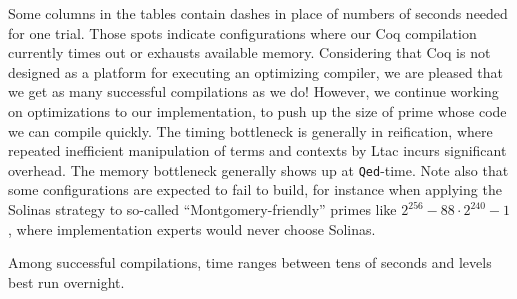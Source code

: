 \documentclass[conference,letterpaper]{IEEEtran}
\begin{document}
Some columns in the tables contain dashes in place of numbers of seconds needed for one trial.
Those spots indicate configurations where our Coq compilation currently times out or exhausts available memory.
Considering that Coq is not designed as a platform for executing an optimizing compiler, we are pleased that we get as many successful compilations as we do!
However, we continue working on optimizations to our implementation, to push up the size of prime whose code we can compile quickly.
The timing bottleneck is generally in reification, where repeated inefficient manipulation of terms and contexts by Ltac incurs significant overhead.
The memory bottleneck generally shows up at \texttt{Qed}-time.
Note also that some configurations are expected to fail to build, for instance when applying the Solinas strategy to so-called ``Montgomery-friendly'' primes like $2^{256} - 88 \cdot 2^{240} - 1$, where implementation experts would never choose Solinas.

Among successful compilations, time ranges between tens of seconds and levels best run overnight.
\end{document}
